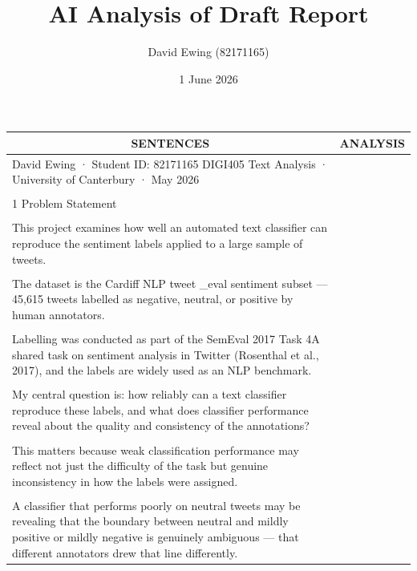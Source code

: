 \documentclass[11pt]{article}
\title{AI Analysis of Draft Report}
\author{David Ewing (82171165)}
\date{1 June 2026}
\begin{document}
\maketitle
\thispagestyle{empty}
\newpage

\begin{longtable}{|p{}|p{}|}
\hline
\multicolumn{1}{|c|}{\textbf{SENTENCES}} & \multicolumn{1}{c|}{\textbf{ANALYSIS}} \\[2pt]
\hline
David Ewing · Student ID: 82171165 DIGI405 Text Analysis · University of Canterbury · May 2026 & \\[2pt]
\hline
\rule{0pt}{3.5cm} & \\
\hline
1 Problem Statement & \\[2pt]
\hline
\rule{0pt}{3.5cm} & \\
\hline
This project examines how well an automated text classifier can reproduce the sentiment labels applied to a large sample of tweets. & \\[2pt]
\hline
\rule{0pt}{3.5cm} & \\
\hline
The dataset is the Cardiff NLP tweet \_eval sentiment subset --- 45,615 tweets labelled as negative, neutral, or positive by human annotators. & \\[2pt]
\hline
\rule{0pt}{3.5cm} & \\
\hline
Labelling was conducted as part of the SemEval 2017 Task 4A shared task on sentiment analysis in Twitter (Rosenthal et al., 2017), and the labels are widely used as an NLP benchmark. & \\[2pt]
\hline
\rule{0pt}{3.5cm} & \\
\hline
My central question is: how reliably can a text classifier reproduce these labels, and what does classifier performance reveal about the quality and consistency of the annotations? & \\[2pt]
\hline
\rule{0pt}{3.5cm} & \\
\hline
This matters because weak classification performance may reflect not just the difficulty of the task but genuine inconsistency in how the labels were assigned. & \\[2pt]
\hline
\rule{0pt}{3.5cm} & \\
\hline
A classifier that performs poorly on neutral tweets may be revealing that the boundary between neutral and mildly positive or mildly negative is genuinely ambiguous --- that different annotators drew that line differently. & \\[2pt]

\end{longtable}
\end{document}
